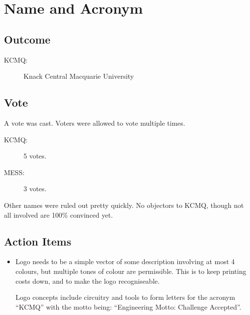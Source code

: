 \section{Name and Acronym}
\label{sec:NameAndAcronym}
\subsection{Outcome}
\begin{description}
  \item[KCMQ:] Knack Central Macquarie University
\end{description}


\subsection{Vote}
A vote was cast. Voters were allowed to vote multiple times.
\begin{description}
  \item[KCMQ:] 5 votes.
  \item[MESS:] 3 votes.
\end{description}
Other names were ruled out pretty quickly. No objectors to KCMQ, though not all
involved are 100\% convinced yet.

\subsection{Action Items}
\begin{itemize}
  \item Logo needs to be a simple vector of some description involving at most 4
colours, but multiple tones of colour are permissible. This is to keep printing
costs down, and to make the logo recogniseable.

Logo concepts include circuitry and tools to form letters for the acronym
``KCMQ'' with the motto being: ``Engineering Motto: Challenge Accepted''.
\end{itemize}